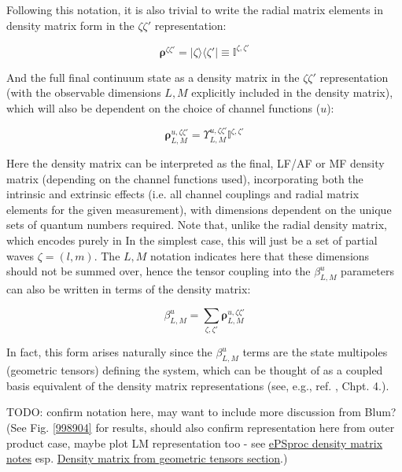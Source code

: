 Following this notation, it is also trivial to write the radial matrix elements in density matrix form in the $\zeta\zeta'$ representation:

\begin{equation}
\mathbf{\rho}^{\zeta\zeta'} = |\zeta\rangle\langle\zeta'| \equiv \mathbb{I}^{\zeta,\zeta'}
\end{equation}

And the full final continuum state as a density matrix in the $\zeta\zeta'$ representation (with the observable dimensions $L,M$ explicitly included in the density matrix), which will also be dependent on the choice of channel functions ($u$):

\begin{equation}
\mathbf{\rho}_{L,M}^{u,\zeta\zeta'}=\varUpsilon_{L,M}^{u,\zeta\zeta'}\mathbb{I}^{\zeta,\zeta'}
\end{equation}

Here the density matrix can be interpreted as the final, LF/AF or
MF density matrix (depending on the channel functions used), incorporating both the intrinsic and extrinsic
effects (i.e. all channel couplings and radial matrix elements for
the given measurement), with dimensions dependent on the unique sets of quantum numbers required. Note that, unlike the radial density matrix, which encodes purely in
In the simplest case, this will just be a set of partial waves $\zeta = (l,m)$. The $L,M$ notation indicates here that these dimensions should not be summed over, hence the tensor coupling into the $\beta_{L,M}^{u}$ parameters can also be written in terms of the density matrix:

\begin{equation}
\beta_{L,M}^{u}=\sum_{\zeta,\zeta'}\mathbf{\rho}_{L,M}^{u,\zeta\zeta'}
\end{equation}

In fact, this form arises naturally since the $\beta_{L,M}^{u}$ terms are the state multipoles (geometric tensors) defining the system, which can be thought of as a coupled basis equivalent of the density matrix representations (see, e.g., ref. \cite{BlumDensityMat}, Chpt. 4.).

TODO: confirm notation here, may want to include more discussion from Blum? (See Fig. \ref{998904} for results, should also confirm representation here from outer product case, maybe plot LM representation too - see \href{https://epsproc.readthedocs.io/en/dev/methods/density_mat_notes_demo_300821.html}{ePSproc density matrix notes} esp. \href{https://epsproc.readthedocs.io/en/dev/methods/density_mat_notes_demo_300821.html#Density-matrix-from-geometric-tensors}{Density matrix from geometric tensors section}.)



